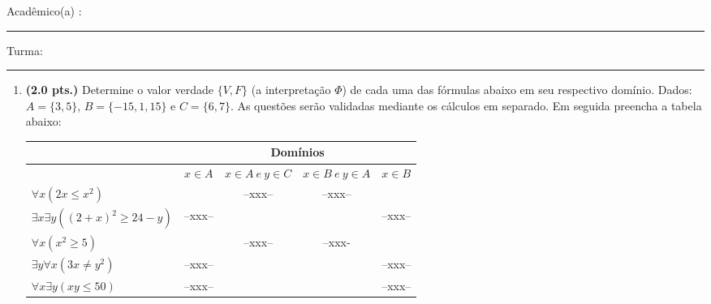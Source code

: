 \documentclass[a4paper,11pt]{article}
\begin{document}


\vskip 0.5cm Acad\^emico(a) : \rule{10cm}{0.4pt} Turma:  \rule{1cm}{0.4pt}

\begin{enumerate}


\item {\bf (2.0 pts.)} Determine o valor verdade $\{V, F \}$ (a interpretação $\Phi $)
de cada uma das fórmulas abaixo em seu respectivo domínio. Dados: $A = \{ 3,  5 \}$, $B = \{ -15, 1, 15\}$ e  $C = \{ 6,  7 \}$.
As questões serão validadas mediante os cálculos em separado. Em seguida preencha a tabela abaixo:


\begin{center}
\begin{tabular}{l|c|c|c|c} \hline \hline
 & \multicolumn{4}{c}{Domínios} \\ \hline
 & $ x \in A$ & $x \in A ~e~ y \in C$ & $x \in B ~e~ y \in A$ & $x \in B$ \\ \hline

$\forall x (2x \leq x^2)$ & & --xxx-- & --xxx--  & \\ \hline
$\exists x \exists y ((2+x)^2 \geq 24 - y)$ &  --xxx-- & & & --xxx-- \\ \hline
$\forall x (x^2 \geq 5)$ & & --xxx-- & --xxx-  & \\ \hline
$\exists y \forall x (3x \neq y^2)$ & --xxx-- &  & & --xxx-- \\ \hline
$\forall x \exists y (xy \leq 50)$ & --xxx-- &  & & --xxx-- \\ \hline \hline
\end{tabular}
\end{center}



\end{enumerate}
\end{document}

